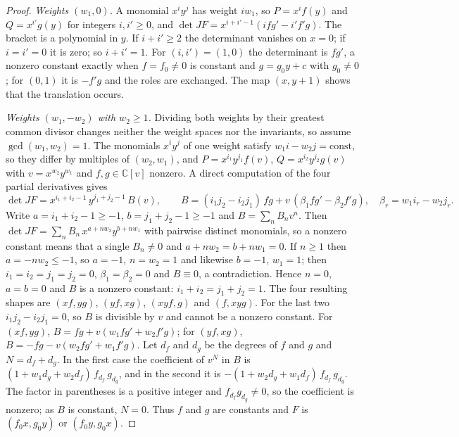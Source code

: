 \documentclass[11pt]{article}
\theoremstyle{definition}
\theoremstyle{remark}
\newcommand{\C}{\mathbb{C}}
\newcommand{\detJ}{\det JF}
\begin{document}
\begin{proof}
\emph{Weights $(w_1, 0)$.} A monomial $x^iy^j$ has weight $iw_1$, so $P = x^{i}f(y)$ and $Q = x^{i'}g(y)$ for integers $i, i' \ge 0$, and $\detJ = x^{i+i'-1}(i f g' - i' f' g)$. The bracket is a polynomial in $y$. If $i + i' \ge 2$ the determinant vanishes on $x = 0$; if $i = i' = 0$ it is zero; so $i + i' = 1$. For $(i,i') = (1,0)$ the determinant is $f g'$, a nonzero constant exactly when $f = f_0 \neq 0$ is constant and $g = g_0y + c$ with $g_0 \neq 0$; for $(0,1)$ it is $-f'g$ and the roles are exchanged. The map $(x, y + 1)$ shows that the translation occurs.

\emph{Weights $(w_1, -w_2)$ with $w_2 \ge 1$.} Dividing both weights by their greatest common divisor changes neither the weight spaces nor the invariants, so assume $\gcd(w_1,w_2) = 1$. The monomials $x^iy^j$ of one weight satisfy $w_1 i - w_2 j = \mathrm{const}$, so they differ by multiples of $(w_2, w_1)$, and
$P = x^{i_1}y^{j_1} f(v)$, $Q = x^{i_2}y^{j_2} g(v)$ with $v = x^{w_2}y^{w_1}$ and $f, g \in \C[v]$ nonzero. A direct computation of the four partial derivatives gives
\begin{equation}\label{eq:det2dgen}
\detJ = x^{i_1 + i_2 - 1}\, y^{j_1 + j_2 - 1}\, B(v), \qquad
B = (i_1 j_2 - i_2 j_1)\, f g + v\,(\beta_1 f g' - \beta_2 f' g), \quad \beta_r = w_1 i_r - w_2 j_r .
\end{equation}
Write $a = i_1 + i_2 - 1 \ge -1$, $b = j_1 + j_2 - 1 \ge -1$ and $B = \sum_n B_nv^n$. Then $\detJ = \sum_n B_n\,x^{a + nw_2}y^{b + nw_1}$ with pairwise distinct monomials, so a nonzero constant means that a single $B_n \neq 0$ and $a + nw_2 = b + nw_1 = 0$. If $n \ge 1$ then $a = -nw_2 \le -1$, so $a = -1$, $n = w_2 = 1$ and likewise $b = -1$, $w_1 = 1$; then $i_1 = i_2 = j_1 = j_2 = 0$, $\beta_1 = \beta_2 = 0$ and $B \equiv 0$, a contradiction. Hence $n = 0$, $a = b = 0$ and $B$ is a nonzero constant: $i_1 + i_2 = j_1 + j_2 = 1$. The four resulting shapes are $(xf, yg)$, $(yf, xg)$, $(xyf, g)$ and $(f, xyg)$. For the last two $i_1j_2 - i_2j_1 = 0$, so $B$ is divisible by $v$ and cannot be a nonzero constant. For $(xf, yg)$, $B = fg + v(w_1fg' + w_2f'g)$; for $(yf, xg)$, $B = -fg - v(w_2fg' + w_1f'g)$. Let $d_f$ and $d_g$ be the degrees of $f$ and $g$ and $N = d_f + d_g$. In the first case the coefficient of $v^N$ in $B$ is $(1 + w_1d_g + w_2d_f)\,f_{d_f}\,g_{d_g}$, and in the second it is $-(1 + w_2d_g + w_1d_f)\,f_{d_f}\,g_{d_g}$. The factor in parentheses is a positive integer and $f_{d_f}g_{d_g} \neq 0$, so the coefficient is nonzero; as $B$ is constant, $N = 0$. Thus $f$ and $g$ are constants and $F$ is $(f_0 x, g_0 y)$ or $(f_0 y, g_0 x)$.
\end{proof}
\end{document}

